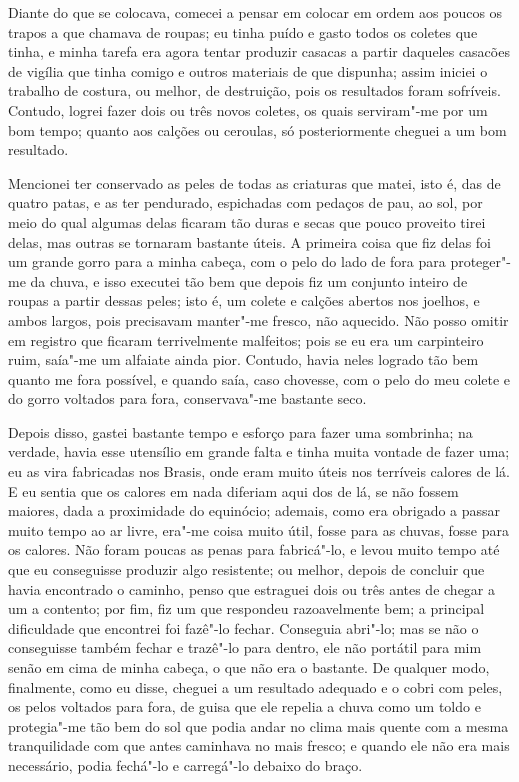 Diante do que se colocava, comecei a pensar em colocar em ordem aos
poucos os trapos a que chamava de roupas; eu tinha puído e gasto todos
os coletes que tinha, e minha tarefa era agora tentar produzir casacas a
partir daqueles casacões de vigília que tinha comigo e outros materiais
de que dispunha; assim iniciei o trabalho de costura, ou melhor, de
destruição, pois os resultados foram sofríveis. Contudo, logrei fazer
dois ou três novos coletes, os quais serviram"-me por um bom tempo;
quanto aos calções ou ceroulas, só posteriormente cheguei a um bom
resultado.

Mencionei ter conservado as peles de todas as criaturas que matei, isto
é, das de quatro patas, e as ter pendurado, espichadas com pedaços de
pau, ao sol, por meio do qual algumas delas ficaram tão duras e secas
que pouco proveito tirei delas, mas outras se tornaram bastante úteis. A
primeira coisa que fiz delas foi um grande gorro para a minha cabeça,
com o pelo do lado de fora para proteger"-me da chuva, e isso executei
tão bem que depois fiz um conjunto inteiro de roupas a partir dessas
peles; isto é, um colete e calções abertos nos joelhos, e ambos largos,
pois precisavam manter"-me fresco, não aquecido. Não posso omitir em
registro que ficaram terrivelmente malfeitos; pois se eu era um
carpinteiro ruim, saía"-me um alfaiate ainda pior. Contudo, havia neles
logrado tão bem quanto me fora possível, e quando saía, caso chovesse,
com o pelo do meu colete e do gorro voltados para fora, conservava"-me
bastante seco.

Depois disso, gastei bastante tempo e esforço para fazer uma sombrinha;
na verdade, havia esse utensílio em grande falta e tinha muita vontade
de fazer uma; eu as vira fabricadas nos Brasis, onde eram muito úteis
nos terríveis calores de lá. E eu sentia que os calores em nada diferiam
aqui dos de lá, se não fossem maiores, dada a proximidade do equinócio;
ademais, como era obrigado a passar muito tempo ao ar livre, era"-me
coisa muito útil, fosse para as chuvas, fosse para os calores. Não foram
poucas as penas para fabricá"-lo, e levou muito tempo até que eu
conseguisse produzir algo resistente; ou melhor, depois de concluir que
havia encontrado o caminho, penso que estraguei dois ou três antes de
chegar a um a contento; por fim, fiz um que respondeu razoavelmente bem;
a principal dificuldade que encontrei foi fazê"-lo fechar. Conseguia
abri"-lo; mas se não o conseguisse também fechar e trazê"-lo para dentro,
ele não portátil para mim senão em cima de minha cabeça, o que não era o
bastante. De qualquer modo, finalmente, como eu disse, cheguei a um
resultado adequado e o cobri com peles, os pelos voltados para fora, de
guisa que ele repelia a chuva como um toldo e protegia"-me tão bem do sol
que podia andar no clima mais quente com a mesma tranquilidade com que
antes caminhava no mais fresco; e quando ele não era mais necessário,
podia fechá"-lo e carregá"-lo debaixo do braço.

